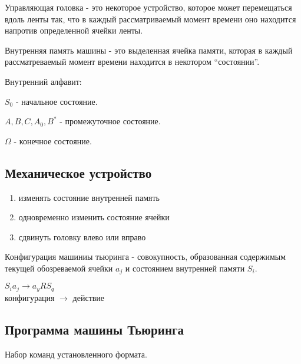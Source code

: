 \begin{definition}
  Управляющая головка - это некоторое устройство, которое может перемещаться
  вдоль ленты так, что в каждый рассматриваемый момент времени оно находится
  напротив определенной ячейки ленты.
\end{definition}

\begin{definition}
  Внутренняя память машины - это выделенная ячейка памяти, которая в каждый 
  рассматреваемый момент времени находится в некотором ``состоянии''.
\end{definition}

Внутренний алфавит:
\begin{remark}
  $S_0$ - начальное состояние.
\end{remark}

\begin{remark}
  $A, B, C, A_0, B^*$ - промежуточное состояние.
\end{remark}

\begin{remark}
  $\Omega$ - конечное состояние.
\end{remark}

\subsection{Механическое устройство}
\begin{enumerate}
  \item изменять состояние внутренней память
  \item одновременно изменить состояние ячейки
  \item сдвинуть головку влево или вправо
\end{enumerate}

\begin{definition}
  Конфигурация машиниы тьюринга - совокупность, образованная содержимым
  текущей обозреваемой ячейки $a_j$ и состоянием внутренней памяти $S_i$.
\end{definition}
\begin{example}
  $S_ia_j \to a_yRS_q$ \\
  конфигурация $\to$ действие
\end{example}

\subsection{Программа машины Тьюринга}
\begin{definition}
  Набор команд установленного формата.
\end{definition}

